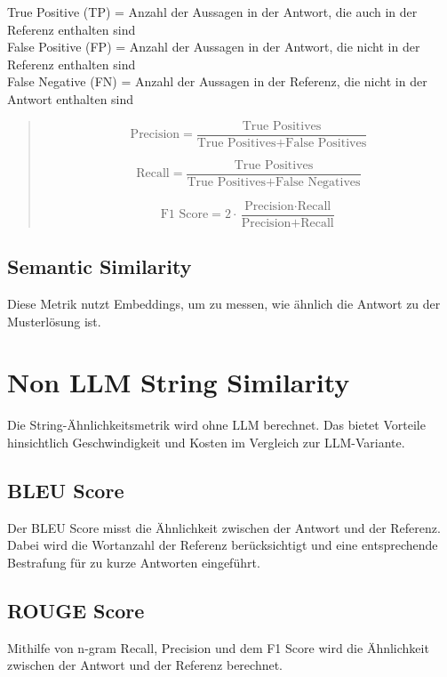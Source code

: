 True Positive (TP) = Anzahl der Aussagen in der Antwort, die auch in der Referenz enthalten sind\\
False Positive (FP) = Anzahl der Aussagen in der Antwort, die nicht in der Referenz enthalten sind\\
False Negative (FN) = Anzahl der Aussagen in der Referenz, die nicht in der Antwort enthalten sind\\

\begin{quote}
\begin{equation}
  \label{eq:precision}
  \text{Precision} = \frac{\text{True Positives}}{\text{True Positives} + \text{False Positives}}
\end{equation}

\begin{equation}
  \label{eq:recall}
  \text{Recall} = \frac{\text{True Positives}}{\text{True Positives} + \text{False Negatives}}
\end{equation}

\begin{equation}
  \label{eq:f1_score}
  \text{F1 Score} = 2 \cdot \frac{\text{Precision} \cdot \text{Recall}}{\text{Precision} + \text{Recall}}
\end{equation}
\cite{wikipedia_confusion_matrix}
\end{quote}

\subsection{Semantic Similarity}
Diese Metrik nutzt Embeddings, um zu messen, wie ähnlich die Antwort zu der Musterlösung ist.

\section{Non LLM String Similarity}
Die String-Ähnlichkeitsmetrik wird ohne LLM berechnet. Das bietet Vorteile hinsichtlich Geschwindigkeit und Kosten im Vergleich zur LLM-Variante.
\subsection{BLEU Score}
Der BLEU Score misst die Ähnlichkeit zwischen der Antwort und der Referenz. Dabei wird die Wortanzahl der Referenz berücksichtigt und eine entsprechende Bestrafung für zu kurze Antworten eingeführt.
\subsection{ROUGE Score}
Mithilfe von n-gram Recall, Precision und dem F1 Score wird die Ähnlichkeit zwischen der Antwort und der Referenz berechnet.
